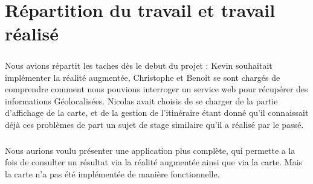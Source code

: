\chapter{Répartition du travail et travail réalisé}
\paragraph{}
Nous avions répartit les taches dès le debut du projet : Kevin souhaitait implémenter la réalité augmentée, Christophe et Benoit se sont chargés de comprendre comment nous pouvions interroger un service web pour récupérer des informations Géolocalisées.
Nicolas avait choisis de se charger de la partie d'affichage de la carte, et de la gestion de l'itinéraire étant donné qu'il connaissait déjà ces problèmes de part un sujet de stage similaire qu'il a réalisé par le passé.

\begin{center}
\end{center}

\paragraph{}
Nous aurions voulu présenter une application plus complète, qui permette a la fois de consulter un résultat via la réalité augmentée ainsi que via la carte. Mais la carte n'a pas été implémentée de manière fonctionnelle.
